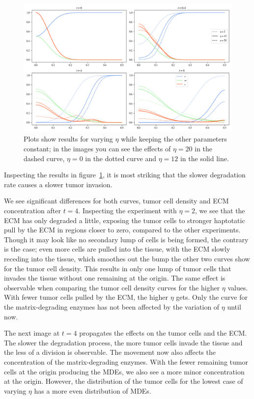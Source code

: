 \begin{figure}[h!]
 \centering
 \includegraphics[width=\textwidth]{resources/images/eta_variation.png}
 \caption{Plots show results for varying $\eta$ while keeping the other parameters constant; in the images you can see the effects of $\eta=20$ in the dashed curve, $\eta=0$ in the dotted curve and $\eta=12$ in the solid line.}
 \label{fig:eta_variation}
\end{figure}
Inspecting the results in figure~\ref{fig:eta_variation}, it is most striking that the slower degradation rate causes a slower tumor invasion. 

We see significant differences for both curves, tumor cell density and ECM concentration after $t=4$. Inspecting the experiment with $\eta=2$, we see that the ECM has only degraded a little, exposing the tumor cells to stronger haptotatic pull by the ECM in regions closer to zero, compared to the other experiments. Though it may look like no secondary lump of cells is being formed, the contrary is the case; even more cells are pulled into the tissue, with the ECM slowly receding into the tissue, which smoothes out the bump the other two curves show for the tumor cell density. This results in only one lump of tumor cells that invades the tissue without one remaining at the origin. The same effect is observable when comparing the tumor cell density curves for the higher $\eta$ values. With fewer tumor cells pulled by the ECM, the higher $\eta$ gets. Only the curve for the matrix-degrading enzymes has not been affected by the variation of $\eta$ until now.

The next image at $t=4$ propagates the effects on the tumor cells and the ECM. The slower the degradation process, the more tumor cells invade the tissue and the less of a division is observable. The movement now also affects the concentration of the matrix-degrading enzymes. With the fewer remaining tumor cells at the origin producing the MDEs, we also see a more minor concentration at the origin. However, the distribution of the tumor cells for the lowest case of varying $\eta$ has a more even distribution of MDEs.

